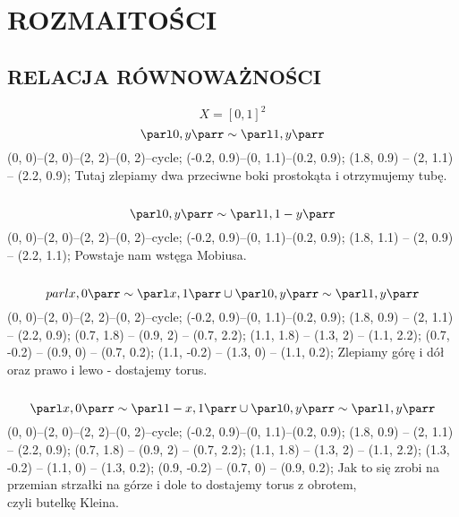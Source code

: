 \section{ROZMAITOŚCI}
\subsection{RELACJA RÓWNOWAŻNOŚCI}
$$X=[0,1]^2$$
$$\parl 0, y\parr \sim \parl 1,y\parr$$
\pmazidlo
     (0, 0)--(2, 0)--(2, 2)--(0, 2)--cycle;
     (-0.2, 0.9)--(0, 1.1)--(0.2, 0.9);
     (1.8, 0.9) -- (2, 1.1) -- (2.2, 0.9);
\kmazidlo
Tutaj zlepiamy dwa przeciwne boki prostokąta i otrzymujemy tubę.\smallskip\\
\smallskip\\
$$\parl 0,y\parr\sim\parl 1,1-y\parr$$
\pmazidlo
     (0, 0)--(2, 0)--(2, 2)--(0, 2)--cycle;
     (-0.2, 0.9)--(0, 1.1)--(0.2, 0.9);
     (1.8, 1.1) -- (2, 0.9) -- (2.2, 1.1);
\kmazidlo
Powstaje nam wstęga Mobiusa.\smallskip\\
\smallskip\\
$$parl x, 0\parr\sim\parl x, 1\parr\cup\parl 0, y\parr\sim\parl 1, y\parr$$
\pmazidlo
     (0, 0)--(2, 0)--(2, 2)--(0, 2)--cycle;
     (-0.2, 0.9)--(0, 1.1)--(0.2, 0.9);
     (1.8, 0.9) -- (2, 1.1) -- (2.2, 0.9);
     (0.7, 1.8) -- (0.9, 2) -- (0.7, 2.2);
     (1.1, 1.8) -- (1.3, 2) -- (1.1, 2.2);
     (0.7, -0.2) -- (0.9, 0) -- (0.7, 0.2);
     (1.1, -0.2) -- (1.3, 0) -- (1.1, 0.2);
\kmazidlo
Zlepiamy górę i dół oraz prawo i lewo - dostajemy torus.\smallskip\\
\smallskip\\
$$\parl x, 0\parr\sim\parl 1-x, 1\parr\cup\parl 0, y\parr\sim\parl 1, y\parr$$
\pmazidlo
     (0, 0)--(2, 0)--(2, 2)--(0, 2)--cycle;
     (-0.2, 0.9)--(0, 1.1)--(0.2, 0.9);
     (1.8, 0.9) -- (2, 1.1) -- (2.2, 0.9);
     (0.7, 1.8) -- (0.9, 2) -- (0.7, 2.2);
     (1.1, 1.8) -- (1.3, 2) -- (1.1, 2.2);
     (1.3, -0.2) -- (1.1, 0) -- (1.3, 0.2);
     (0.9, -0.2) -- (0.7, 0) -- (0.9, 0.2);
\kmazidlo
Jak to się zrobi na przemian strzałki na górze i dole to dostajemy torus z obrotem, \\czyli {\color{acc}butelkę Kleina}.\smallskip\\

